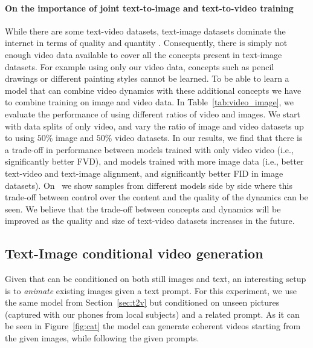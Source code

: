 \paragraph{On the importance of joint text-to-image and text-to-video training}
%

While there are some text-video datasets, text-image datasets dominate the internet in terms of quality and quantity \cite{videocc}. Consequently, there is simply not enough video data available to cover all the concepts present in text-image datasets. For example using only our video data, concepts such as pencil drawings or different painting styles cannot be learned. To be able to learn a model that can combine video dynamics with these additional concepts we have to combine training on image and video data. In Table~\ref{tab:video_image}, we evaluate the performance of using different ratios of video and images. We start with data splits of only video, and vary the ratio of image and video datasets up to using $50\%$ image and $50\%$ video datasets. In our results, we find that there is a trade-off in performance between models trained with only video video (i.e., significantly better FVD), and models trained with more image data (i.e., better text-video and text-image alignment, and significantly better FID in image datasets). On \website\ we show samples from different models side by side where this trade-off between control over the content and the quality of the dynamics can be seen. We believe that the trade-off between concepts and dynamics will be improved as the quality and size of text-video datasets increases in the future.

%

\subsection{Text-Image conditional video generation}
Given that \phenaki can be conditioned on both still images and text, an interesting setup is to \textit{animate} existing images given a text prompt. For this experiment, we use the same model from Section~\ref{sec:t2v} but conditioned on unseen pictures (captured with our phones from local subjects) and a related prompt. As it can be seen in Figure~\ref{fig:cat} the model can generate coherent videos starting from the given images, while following the given prompts. 
%

%

